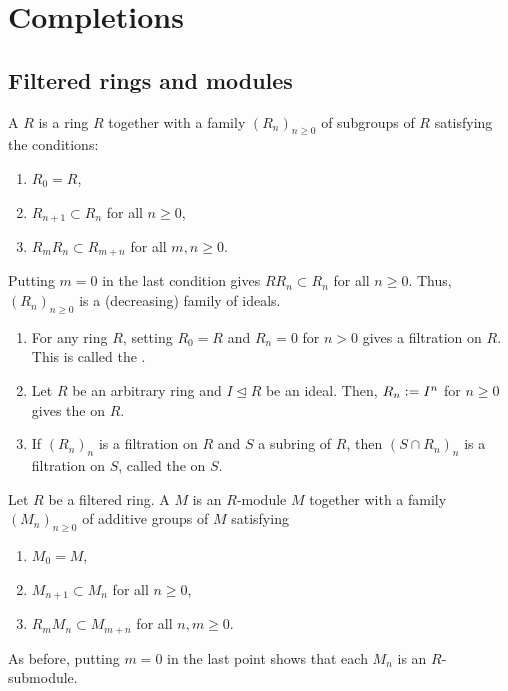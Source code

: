 \section{Completions} \label{sec:completions}

\subsection{Filtered rings and modules}

\begin{defn}
	A  $R$ is a ring $R$ together with a family $(R_{n})_{n \ge 0}$ of subgroups of $R$ satisfying the conditions:
	\begin{enumerate}
		\item $R_{0} = R$,
		\item $R_{n + 1} \subset R_{n}$ for all $n \ge 0$,
		\item $R_{m} R_{n} \subset R_{m + n}$ for all $m, n \ge 0$.
	\end{enumerate}
\end{defn}

Putting $m = 0$ in the last condition gives $R R_{n} \subset R_{n}$ for all $n \ge 0$. Thus, $(R_{n})_{n \ge 0}$ is a (decreasing) family of ideals.

\begin{ex}
	\begin{enumerate}
		\item For any ring $R$, setting $R_{0} = R$ and $R_{n} = 0$ for $n > 0$ gives a filtration on $R$. This is called the .
		\item Let $R$ be an arbitrary ring and $I \unlhd R$ be an ideal. Then, $R_{n} \vcentcolon= I^{n}$ for $n \ge 0$ gives the  on $R$.
		\item If $(R_{n})_{n}$ is a filtration on $R$ and $S$ a subring of $R$, then $(S \cap R_{n})_{n}$ is a filtration on $S$, called the  on $S$.
	\end{enumerate}
\end{ex}

\begin{defn}
	Let $R$ be a filtered ring. A  $M$ is an $R$-module $M$ together with a family $(M_{n})_{n \ge 0}$ of additive groups of $M$ satisfying
	\begin{enumerate}
		\item $M_{0} = M$,
		\item $M_{n + 1} \subset M_{n}$ for all $n \ge 0$, 
		\item $R_{m} M_{n} \subset M_{m + n}$ for all $n, m \ge 0$.
	\end{enumerate}
\end{defn}
As before, putting $m = 0$ in the last point shows that each $M_{n}$ is an $R$-submodule. 

